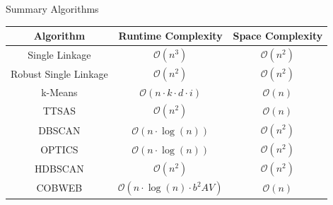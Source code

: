 \documentclass[rgb]{beamer}
\begin{document}
        \begin{frame}{Summary Algorithms}
            \centering
            \begin{tabular}{c c c} \toprule
                Algorithm & Runtime Complexity & Space Complexity  \\ \midrule
                Single Linkage & $\mathcal{O}(n^3)$ & $\mathcal{O}(n^2)$ \\
                Robust Single Linkage & $\mathcal{O}(n^2)$ & $\mathcal{O}(n^2)$ \\
                k-Means & $\mathcal{O}(n \cdot k \cdot d \cdot i)$ & $\mathcal{O}(n)$ \\
                TTSAS & $\mathcal{O}(n^2)$ & $\mathcal{O}(n)$ \\
                DBSCAN & $\mathcal{O}(n \cdot \log(n))$ & $\mathcal{O}(n^2)$ \\
                OPTICS & $\mathcal{O}(n \cdot \log(n))$ & $\mathcal{O}(n^2)$ \\
                HDBSCAN & $\mathcal{O}(n^2)$ & $\mathcal{O}(n^2)$ \\
                COBWEB & $\mathcal{O}(n \cdot \log (n) \cdot b^2 AV)$ & $\mathcal{O}(n)$ \\ \bottomrule
            \end{tabular}
        \end{frame}
    
\end{document}
